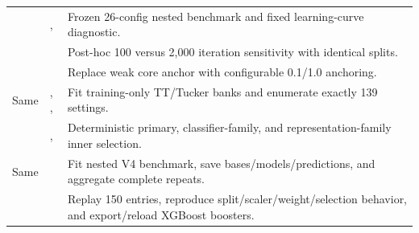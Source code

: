 \begin{longtable}{P{0.28\textwidth}P{0.23\textwidth}P{0.39\textwidth}}
 & ,  & Frozen 26-config nested benchmark and fixed learning-curve diagnostic.\\
 &  & Post-hoc 100 versus 2,000 iteration sensitivity with identical splits.\\
 &  & Replace weak core anchor with configurable 0.1/1.0 anchoring.\\
Same & , ,  & Fit training-only TT/Tucker banks and enumerate exactly 139 settings.\\
 & ,  & Deterministic primary, classifier-family, and representation-family inner selection.\\
Same &  & Fit nested V4 benchmark, save bases/models/predictions, and aggregate complete repeats.\\
 &  & Replay 150 entries, reproduce split/scaler/weight/selection behavior, and export/reload XGBoost boosters.\\
\bottomrule
\end{longtable}
\normalsize
